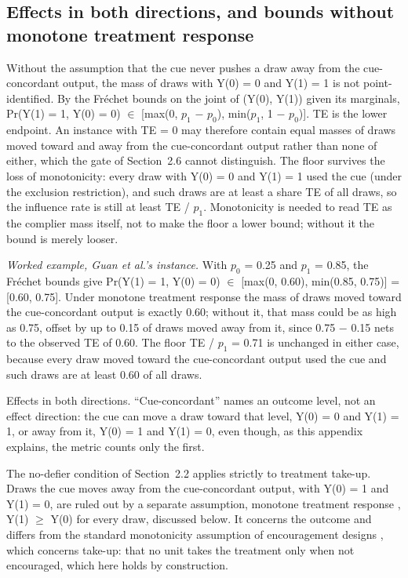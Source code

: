 \documentclass[11pt]{article}
\begin{document}
\subsection{Effects in both directions, and bounds without monotone treatment response}
Without the assumption that the cue never pushes a draw away from the cue-concordant output, the mass of draws with Y(0) = 0 and Y(1) = 1 is not point-identified. By the Fréchet bounds on the joint of (Y(0), Y(1)) given its marginals, Pr(Y(1) = 1, Y(0) = 0) $\in$ [max(0, $p_1$ $-$ $p_0$), min($p_1$, 1 $-$ $p_0$)]. TE is the lower endpoint. An instance with TE = 0 may therefore contain equal masses of draws moved toward and away from the cue-concordant output rather than none of either, which the gate of Section~2.6 cannot distinguish. The floor survives the loss of monotonicity: every draw with Y(0) = 0 and Y(1) = 1 used the cue (under the exclusion restriction), and such draws are at least a share TE of all draws, so the influence rate is still at least TE / $p_1$. Monotonicity is needed to read TE as the complier mass itself, not to make the floor a lower bound; without it the bound is merely looser.

\emph{Worked example, Guan et al.'s instance.} With $p_0$ = 0.25 and $p_1$ = 0.85, the Fréchet bounds give Pr(Y(1) = 1, Y(0) = 0) $\in$ [max(0, 0.60), min(0.85, 0.75)] = [0.60, 0.75]. Under monotone treatment response the mass of draws moved toward the cue-concordant output is exactly 0.60; without it, that mass could be as high as 0.75, offset by up to 0.15 of draws moved away from it, since 0.75 $-$ 0.15 nets to the observed TE of 0.60. The floor TE / $p_1$ = 0.71 is unchanged in either case, because every draw moved toward the cue-concordant output used the cue and such draws are at least 0.60 of all draws.

Effects in both directions. “Cue-concordant” names an outcome level, not an effect direction: the cue can move a draw toward that level, Y(0) = 0 and Y(1) = 1, or away from it, Y(0) = 1 and Y(1) = 0, even though, as this appendix explains, the metric counts only the first.

The no-defier condition of Section~2.2 applies strictly to treatment take-up. Draws the cue moves away from the cue-concordant output, with Y(0) = 1 and Y(1) = 0, are ruled out by a separate assumption, monotone treatment response \citep{manski1997monotone}, Y(1) $\geq$ Y(0) for every draw, discussed below. It concerns the outcome and differs from the standard monotonicity assumption of encouragement designs \citep{imbens1994identification}, which concerns take-up: that no unit takes the treatment only when not encouraged, which here holds by construction.
\end{document}
